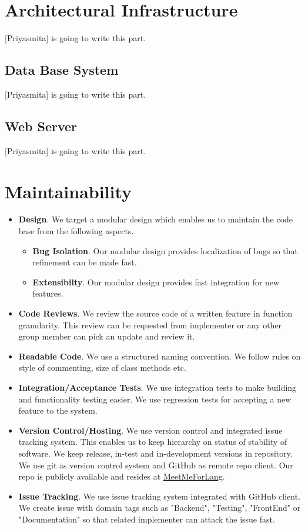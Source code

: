 \section{Architectural Infrastructure} [Priyasmita] is going to write this part.
 \subsection{Data Base System} [Priyasmita] is going to write this part.
 \subsection{Web Server} [Priyasmita] is going to write this part.
 \section{Maintainability}
 \begin{itemize}
   \item \textbf{Design}. We target a modular design which enables us to maintain the code base from the following aspects.
     \begin{itemize}
     \item \textbf{Bug Isolation}. Our modular design provides localization of bugs so that refinement can be made fast.
     \item \textbf{Extensibilty}.  Our modular design provides fast integration for new features.
     \end{itemize}
   \item \textbf{Code Reviews}. We review the source code of a written feature in function granularity. This review can be requested from implementer or any other group member can pick an update and review it.   
   \item \textbf{Readable Code}. We use a structured naming convention. We follow rules on style of commenting, size of class methods etc. 
   \item \textbf{Integration/Acceptance Tests}. We use integration tests to make building and functionality testing  easier. We use regression tests for accepting a new feature to the system.
   \item \textbf{Version Control/Hosting}. We use version control and integrated issue tracking system. This enables us to keep hierarchy on status of stability of software. We keep release, in-test and in-development versions in repository. We use git as version control system and GitHub as remote repo client. Our repo is publicly available and resides at \href{https://github.com/ismailkuru/MeetMeForLang}{MeetMeForLang}.  
     \item \textbf{Issue Tracking}. We use issue tracking system integrated with GitHub client. We create issue with domain tags such as "Backend", "Testing", "FrontEnd" or "Documentation" so that related implementer can attack the issue fast. 
   \end{itemize}
 


